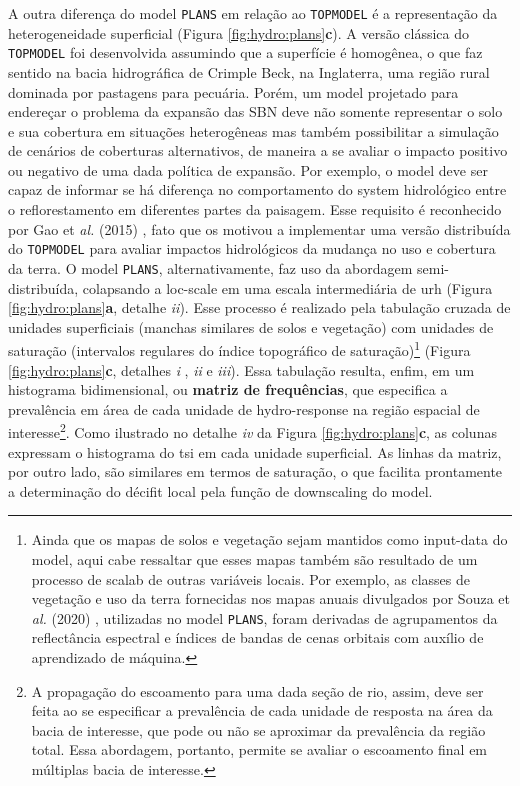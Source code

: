 \documentclass[./main.tex]{subfiles}
\begin{document}
\par A outra diferença do \gls{model} \texttt{PLANS} em relação ao \texttt{TOPMODEL} é a representação da heterogeneidade superficial (Figura \ref{fig:hydro:plans}\textbf{c}). A versão clássica do \texttt{TOPMODEL} foi desenvolvida assumindo que a superfície é homogênea, o que faz sentido na bacia hidrográfica de Crimple Beck, na Inglaterra, uma região rural dominada por pastagens para pecuária. Porém, um \gls{model} projetado para endereçar o problema da expansão das SBN deve não somente representar o solo e sua cobertura em situações heterogêneas mas também possibilitar a simulação de cenários de coberturas alternativos, de maneira a se avaliar o impacto positivo ou negativo de uma dada política de expansão. Por exemplo, o \gls{model} deve ser capaz de informar se há diferença no comportamento do \gls{system} hidrológico entre o reflorestamento em diferentes partes da paisagem. Esse requisito é reconhecido por Gao et \textit{al.} (2015) \cite{Gao2015a}, fato que os motivou a implementar uma versão distribuída do \texttt{TOPMODEL} para avaliar impactos hidrológicos da mudança no uso e cobertura da terra. O \gls{model} \texttt{PLANS}, alternativamente, faz uso da abordagem semi-distribuída, colapsando a \gls{loc-scale} em uma escala intermediária de \gls{urh} (Figura \ref{fig:hydro:plans}\textbf{a}, detalhe \textit{ii}). Esse processo é realizado pela tabulação cruzada de unidades superficiais (manchas similares de solos e vegetação) com unidades de saturação (intervalos regulares do índice topográfico de saturação)\footnote{Ainda que os mapas de solos e vegetação sejam mantidos como \gls{input-data} do \gls{model}, aqui cabe ressaltar que esses mapas também são resultado de um processo de \gls{scalab} de outras variáveis locais. Por exemplo, as classes de vegetação e uso da terra fornecidas nos mapas anuais divulgados por Souza et \textit{al.} (2020) \cite{Souza2020a}, utilizadas no \gls{model} \texttt{PLANS}, foram derivadas de agrupamentos da reflectância espectral e índices de bandas de cenas orbitais com auxílio de aprendizado de máquina.} (Figura \ref{fig:hydro:plans}\textbf{c}, detalhes \textit{i} , \textit{ii} e \textit{iii}). Essa tabulação resulta, enfim, em um histograma bidimensional, ou \textbf{matriz de frequências}, que especifica a prevalência em área de cada unidade de \gls{hydro-response} na região espacial de interesse\footnote{A propagação do escoamento para uma dada seção de rio, assim, deve ser feita ao se especificar a prevalência de cada unidade de resposta na área da bacia de interesse, que pode ou não se aproximar da prevalência da região total. Essa abordagem, portanto, permite se avaliar o escoamento final em múltiplas bacia de interesse.}. Como ilustrado no detalhe \textit{iv} da Figura \ref{fig:hydro:plans}\textbf{c}, as colunas expressam o histograma do \gls{tsi} em cada unidade superficial. As linhas da matriz, por outro lado, são similares em termos de saturação, o que facilita prontamente a determinação do décifit local pela função de \gls{downscaling} do \gls{model}. 
\end{document}

